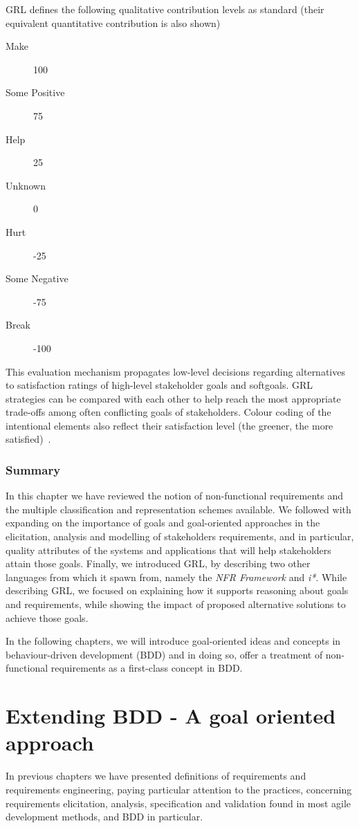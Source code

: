 \documentclass[dissertation,final]{softeng}
\newcommand{\nfrs}{non-functional requirements\xspace}
\begin{document}
{GRL defines the following qualitative contribution levels as standard (their equivalent quantitative contribution is also shown)
\begin{description}
\item[Make] 100
\item[Some Positive] 75
\item[Help] 25
\item[Unknown] 0
\item[Hurt] -25
\item[Some Negative] -75
\item[Break] -100
\end{description}

This evaluation mechanism propagates low-level decisions regarding alternatives to satisfaction ratings of high-level stakeholder goals and softgoals. GRL strategies can be compared with each other to help reach the most appropriate trade-offs among often conflicting goals of stakeholders. Colour coding of the intentional elements also reflect their satisfaction level (the greener, the more satisfied)~\citep{amyot2011user}.

\subsection{Summary}

In this chapter we have reviewed the notion of non-functional requirements and the multiple classification and representation schemes available. We followed with expanding on the importance of goals and goal-oriented approaches in the elicitation, analysis and modelling of stakeholders requirements, and in particular, quality attributes of the systems and applications that will help stakeholders attain those goals. Finally, we introduced GRL, by describing two other languages from which it spawn from, namely the \emph{NFR Framework} and \emph{i*}. While describing GRL, we focused on explaining how it supports reasoning about goals and requirements, while showing the impact of proposed alternative solutions to achieve those goals.

In the following chapters, we will introduce goal-oriented ideas and concepts in behaviour-driven development (BDD) and in doing so, offer a treatment of \nfrs as a first-class concept in BDD.

}
\chapter{Extending BDD - A goal oriented approach}
\label{ch:Extendingbdd}
In previous chapters we have presented definitions of requirements and requirements engineering, paying particular attention to the practices, concerning requirements elicitation, analysis, specification and validation found in most agile development methods, and BDD in particular.
\end{document}
